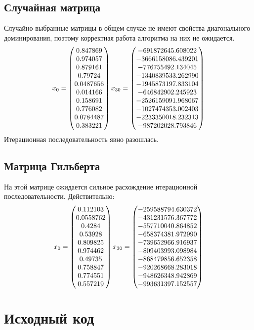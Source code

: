 \documentclass[../../report.tex]{subfiles}
\begin{document}
\subsection{Случайная матрица}
Случайно выбранные матрицы в общем случае не имеют свойства диагонального доминирования, 
поэтому корректная работа алгоритма на них не ожидается.
\[
x_0 = 
\begin{pmatrix} 
0.847869 \\
0.974057 \\
0.879161 \\
0.79724 \\
0.0487656 \\
0.014166 \\
0.158691 \\
0.776082 \\
0.0784487 \\
0.383221 
\end{pmatrix}
x_{30} = \randomResult
\]
Итерационная последовательность явно разошлась.

\subsection{Матрица Гильберта}
На этой матрице ожидается сильное расхождение итерационной последовательности. Действительно:
\[
x_0 = 
\begin{pmatrix}
0.112103 \\
0.0558762 \\
0.4284 \\
0.53928 \\
0.809825 \\
0.974462 \\
0.49735 \\
0.758847 \\
0.774551 \\
0.557219
\end{pmatrix}
x_{30} = \hilbertResult
\]
\section{Исходный код}
\end{document}
